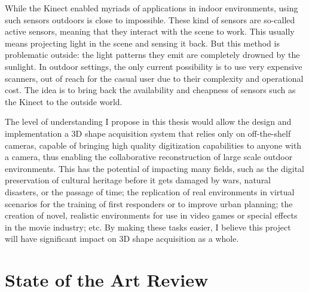 \documentclass{report}
\begin{document}
While the Kinect enabled myriads of applications in indoor environments, using such sensors outdoors is close to impossible. These kind of sensors are so-called active sensors, meaning that they interact with the scene to work. This usually means projecting light in the scene and sensing it back. But this method is problematic outside: the light patterns they emit are completely drowned by the sunlight. In outdoor settings, the only current possibility is to use very expensive scanners, out of reach for the casual user due to their complexity and operational cost. The idea is to bring back the availability and cheapness of sensors such as the Kinect to the outside world.

The level of understanding I propose in this thesis would allow the design and implementation a 3D shape acquisition system that relies only on off-the-shelf cameras, capable of bringing high quality digitization capabilities to anyone with a camera, thus enabling the collaborative reconstruction of large scale outdoor environments. This has the potential of impacting many fields, such as the digital preservation of cultural heritage before it gets damaged by wars, natural disasters, or the passage of time; the replication of real environments in virtual scenarios for the training of first responders or to improve urban planning; the creation of novel, realistic environments for use in video games or special effects in the movie industry; etc. By making these tasks easier, I believe this project will have significant impact on 3D shape acquisition as a whole.


\chapter{State of the Art Review}
\label{c:sota}

\end{document}
